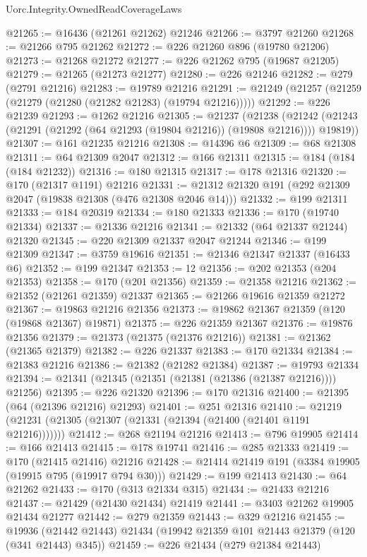 \begin{lexlean}{Uorc.Integrity.OwnedReadCoverageLaws}
\begin{coremodule}
@21265 := @16436 (@21261 @21262) @21246
@21266 := @3797 @21260
@21268 := @21266 @795 @21262
@21272 := @226 @21260 @896 (@19780 @21206)
@21273 := @21268 @21272
@21277 := @226 @21262 @795 (@19687 @21205)
@21279 := @21265 (@21273 @21277)
@21280 := @226 @21246
@21282 := @279 (@2791 @21216)
@21283 := @19789 @21216
@21291 := @21249 (@21257 (@21259 (@21279 (@21280 (@21282 @21283) (@19794 @21216)))))
@21292 := @226 @21239
@21293 := @1262 @21216
@21305 := @21237
    (@21238 (@21242 (@21243 (@21291 (@21292 (@64 @21293 (@19804 @21216)) (@19808 @21216)))) @19819))
@21307 := @161 @21235 @21216
@21308 := @14396 @6
@21309 := @68 @21308
@21311 := @64 @21309 @2047
@21312 := @166 @21311
@21315 := @184 (@184 (@184 @21232))
@21316 := @180 @21315
@21317 := @178 @21316
@21320 := @170 (@21317 @1191) @21216
@21331 := @21312 @21320 @191 (@292 @21309 @2047 (@19838 @21308 (@476 @21308 @2046 @14)))
@21332 := @199 @21311
@21333 := @184 @20319
@21334 := @180 @21333
@21336 := @170 (@19740 @21334)
@21337 := @21336 @21216
@21341 := @21332 (@64 @21337 @21244) @21320
@21345 := @220 @21309 @21337 @2047 @21244
@21346 := @199 @21309
@21347 := @3759 @19616
@21351 := @21346 @21347 @21337 (@16433 @6)
@21352 := @199 @21347
@21353 := 12
@21356 := @202 @21353 (@204 @21353)
@21358 := @170 (@201 @21356)
@21359 := @21358 @21216
@21362 := @21352 (@21261 @21359) @21337
@21365 := @21266 @19616 @21359 @21272
@21367 := @19863 @21216 @21356
@21373 := @19862 @21367 @21359 (@120 (@19868 @21367) @19871)
@21375 := @226 @21359 @21367
@21376 := @19876 @21356
@21379 := @21373 (@21375 (@21376 @21216))
@21381 := @21362 (@21365 @21379)
@21382 := @226 @21337
@21383 := @170 @21334
@21384 := @21383 @21216
@21386 := @21382 (@21282 @21384)
@21387 := @19793 @21334
@21394 := @21341 (@21345 (@21351 (@21381 (@21386 (@21387 @21216)))) @21256)
@21395 := @226 @21320
@21396 := @170 @21316
@21400 := @21395 (@64 (@21396 @21216) @21293)
@21401 := @251 @21316
@21410 := @21219 (@21231 (@21305 (@21307 (@21331 (@21394 (@21400 (@21401 @1191 @21216)))))))
@21412 := @268 @21194 @21216
@21413 := @796 @19905
@21414 := @166 @21413
@21415 := @178 @19741
@21416 := @285 @21333
@21419 := @170 (@21415 @21416) @21216
@21428 := @21414 @21419 @191 (@3384 @19905 (@19915 @795 (@19917 @794 @30)))
@21429 := @199 @21413
@21430 := @64 @21262
@21433 := @170 (@313 @21334 @315)
@21434 := @21433 @21216
@21437 := @21429 (@21430 @21434) @21419
@21441 := @3403 @21262 @19905 @21434 @21277
@21442 := @279 @21359
@21443 := @329 @21216
@21455 := @19936 (@21442 @21443) @21434 (@19942 @21359 @101 @21443 @21379 (@120 (@341 @21443) @345))
@21459 := @226 @21434 (@279 @21384 @21443)

\end{coremodule}
\end{lexlean}
